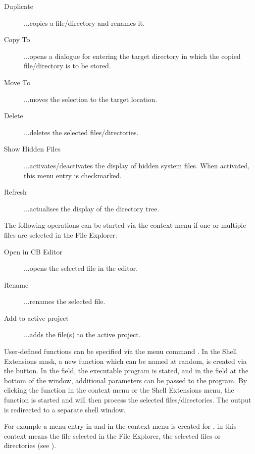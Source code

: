 \begin{description}
\item[Duplicate] ...copies a file/directory and renames it.
\item[Copy To] ...opens a dialogue for entering the target directory in which the copied file/directory is to be stored.
\item[Move To] ...moves the selection to the target location.
\item[Delete] ...deletes the selected files/directories.
\item[Show Hidden Files] ...activates/deactivates the display of hidden system files. When activated, this menu entry is checkmarked.
\item[Refresh] ...actualises the display of the directory tree.
\end{description}

The following operations can be started via the context menu if one or multiple files are selected in the File Explorer:

\begin{description}
\item[Open in CB Editor] ...opens the selected file in the \codeblocks editor.
\item[Rename] ...renames the selected file.
\item[Add to active project] ...adds the file(s) to the active project.
\end{description}


User-defined functions can be specified via the menu command . In the Shell Extensions mask, a new function which can be named at random, is created via the  button. In the  field, the executable program is stated, and in the field at the bottom of the window, additional parameters can be passed to the program.
By clicking the function in the context menu or the Shell Extensions menu, the function is started and will then process the selected files/directories. The output is redirected to a separate shell window.

For example a menu entry in  and in the context menu is created for .  in this context means the file selected in the File Explorer,  the selected files or directories (see ).

